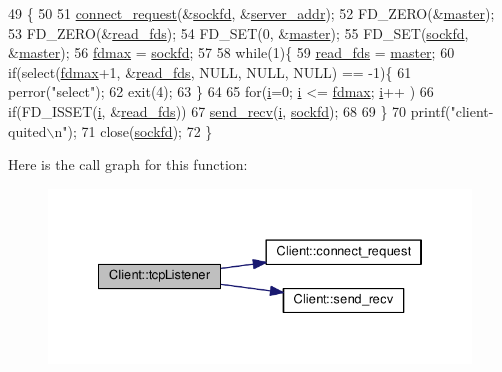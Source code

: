\begin{DoxyCode}
49 \{
50 
51     \hyperlink{class_client_a63a0074432524094592cc95ec3b8c31c}{connect\_request}(&\hyperlink{class_client_ab0cf9b759ba4da79ccb0a64242d944c4}{sockfd}, &\hyperlink{class_client_a3787f155329f63a3bae120e9deca92d6}{server\_addr});
52     FD\_ZERO(&\hyperlink{class_client_a56c611a99e0ba2a2efaddeb9ae021618}{master});
53     FD\_ZERO(&\hyperlink{class_client_a3631a848d923649af981576df2c83506}{read\_fds});
54     FD\_SET(0, &\hyperlink{class_client_a56c611a99e0ba2a2efaddeb9ae021618}{master});
55     FD\_SET(\hyperlink{class_client_ab0cf9b759ba4da79ccb0a64242d944c4}{sockfd}, &\hyperlink{class_client_a56c611a99e0ba2a2efaddeb9ae021618}{master});
56     \hyperlink{class_client_a99ae6181165c7b5119a4c93f3b1908c8}{fdmax} = \hyperlink{class_client_ab0cf9b759ba4da79ccb0a64242d944c4}{sockfd};
57 
58     \textcolor{keywordflow}{while}(1)\{
59         \hyperlink{class_client_a3631a848d923649af981576df2c83506}{read\_fds} = \hyperlink{class_client_a56c611a99e0ba2a2efaddeb9ae021618}{master};
60         \textcolor{keywordflow}{if}(select(\hyperlink{class_client_a99ae6181165c7b5119a4c93f3b1908c8}{fdmax}+1, &\hyperlink{class_client_a3631a848d923649af981576df2c83506}{read\_fds}, NULL, NULL, NULL) == -1)\{
61             perror(\textcolor{stringliteral}{"select"});
62             exit(4);
63         \}
64         
65         \textcolor{keywordflow}{for}(\hyperlink{class_client_a8086f64d20f268817ef23bc81cbea059}{i}=0; \hyperlink{class_client_a8086f64d20f268817ef23bc81cbea059}{i} <= \hyperlink{class_client_a99ae6181165c7b5119a4c93f3b1908c8}{fdmax}; \hyperlink{class_client_a8086f64d20f268817ef23bc81cbea059}{i}++ )
66             \textcolor{keywordflow}{if}(FD\_ISSET(\hyperlink{class_client_a8086f64d20f268817ef23bc81cbea059}{i}, &\hyperlink{class_client_a3631a848d923649af981576df2c83506}{read\_fds}))
67                 \hyperlink{class_client_a7d7ba78b63357fe2c7566018e30e9767}{send\_recv}(\hyperlink{class_client_a8086f64d20f268817ef23bc81cbea059}{i}, \hyperlink{class_client_ab0cf9b759ba4da79ccb0a64242d944c4}{sockfd});
68     
69     \}
70     printf(\textcolor{stringliteral}{"client-quited\(\backslash\)n"});
71     close(\hyperlink{class_client_ab0cf9b759ba4da79ccb0a64242d944c4}{sockfd});
72 \}
\end{DoxyCode}


Here is the call graph for this function\+:
\nopagebreak
\begin{figure}[H]
\begin{center}
\leavevmode
\includegraphics[width=334pt]{class_client_a3e98bb9f68d2fc456e772bb88df85374_cgraph}
\end{center}
\end{figure}


